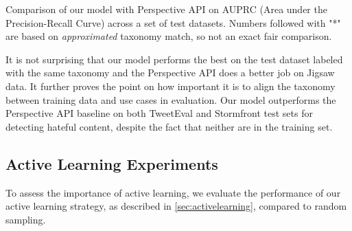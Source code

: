 \documentclass[letterpaper]{article} %
\begin{document}

\begin{table}[]
    \centering
    \resizebox{\columnwidth}{!}{}
    \caption{Comparison of our model with Perspective API on AUPRC (Area under the Precision-Recall Curve) across a set of test datasets. Numbers followed with "*" are based on \textit{approximated} taxonomy match, so not an exact fair comparison.}
    \label{table:auc}
\end{table}

It is not surprising that our model performs the best on the test dataset labeled with the same taxonomy and the Perspective API does a better job on Jigsaw data. It further proves the point on how important it is to align the taxonomy between training data and use cases in evaluation. Our model outperforms the Perspective API baseline on both TweetEval and Stormfront test sets for detecting hateful content, despite the fact that neither are in the training set.


\subsection{Active Learning Experiments}
\label{sec:active_learning_exp}

To assess the importance of active learning, we evaluate the performance of our active learning strategy, as described in \cref{sec:activelearning}, compared to random sampling.


\end{document}
